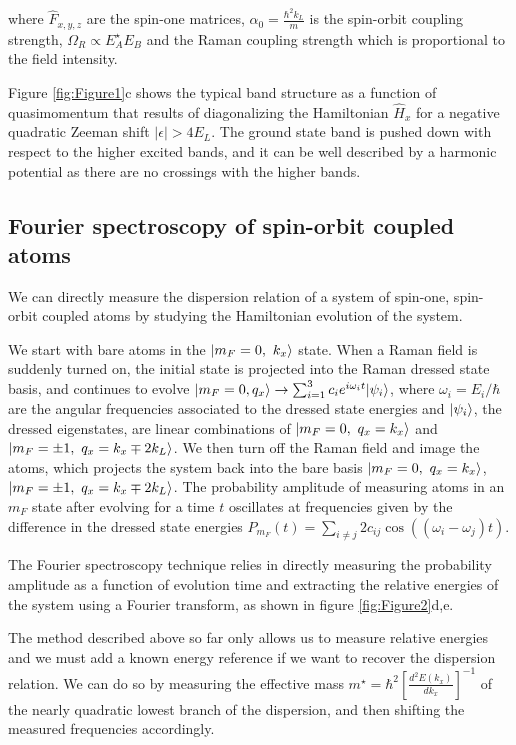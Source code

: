  where $\hat{F}_{x,y,z}$ are the spin-one matrices,  $\alpha_0=\frac{\hbar^2k_L}{m}$ is the spin-orbit coupling strength, $\Omega_R\propto E_A^{\star}E_B$ and the Raman coupling strength which is proportional to the field intensity. 
 
Figure \ref{fig:Figure1}c shows the typical band structure as a function of quasimomentum that results of diagonalizing the Hamiltonian $\hat{H}_x$ for a negative quadratic Zeeman shift $|\epsilon|>4E_L$. The ground state band is pushed down with respect to the higher excited bands, and it can be well described by a harmonic potential as there are no crossings with the higher bands. 

\subsection{Fourier spectroscopy of spin-orbit coupled atoms}		

We can directly measure the dispersion relation of a system of spin-one, spin-orbit coupled atoms by studying the Hamiltonian evolution of the system.

We start with bare atoms in the $|m_F=0,\ k_x\rangle$ state. When a Raman field is suddenly turned on, the initial state is projected into the Raman dressed state basis, and continues to evolve 
$|m_F=0, q_x\rangle\rightarrow \sum_{i=1}^3c_{i}e^{i\omega_it} |\psi_i\rangle$, where $\omega_i=E_i/\hbar$ are the angular frequencies associated to the dressed state energies and $|\psi_i\rangle$, the dressed eigenstates,  are linear combinations of $\ket{m_F=0,\ q_x=k_x}$ and $\ket{m_F=\pm1,\ q_x=k_x\mp2k_L}$. We then turn off the Raman field and image the atoms, which projects the system back into the bare basis $\ket{m_F=0,\ q_x=k_x}$, $\ket{m_F=\pm1,\ q_x=k_x\mp2k_L}$. The probability amplitude of measuring atoms in an $m_F$ state after evolving for a time $t$ oscillates at frequencies given by the difference in the dressed state energies $P_{m_F}(t)=\sum\limits_{i\neq j} 2c_{ij}\cos((\omega_i-\omega_j)t)$.

The Fourier spectroscopy technique relies in directly measuring the probability amplitude as a function of evolution time and extracting the relative energies of the system using a Fourier transform, as shown in figure \ref{fig:Figure2}d,e.

The method described above so far only allows us to measure relative energies and we must add a known energy reference if we want to recover the dispersion relation. We can do so by measuring the effective mass $m^{\star} = \hbar^2[\frac{d^2E(k_x)}{dk_x}]^{-1}$ of the nearly quadratic lowest branch of the dispersion, and then shifting the measured frequencies accordingly. 

